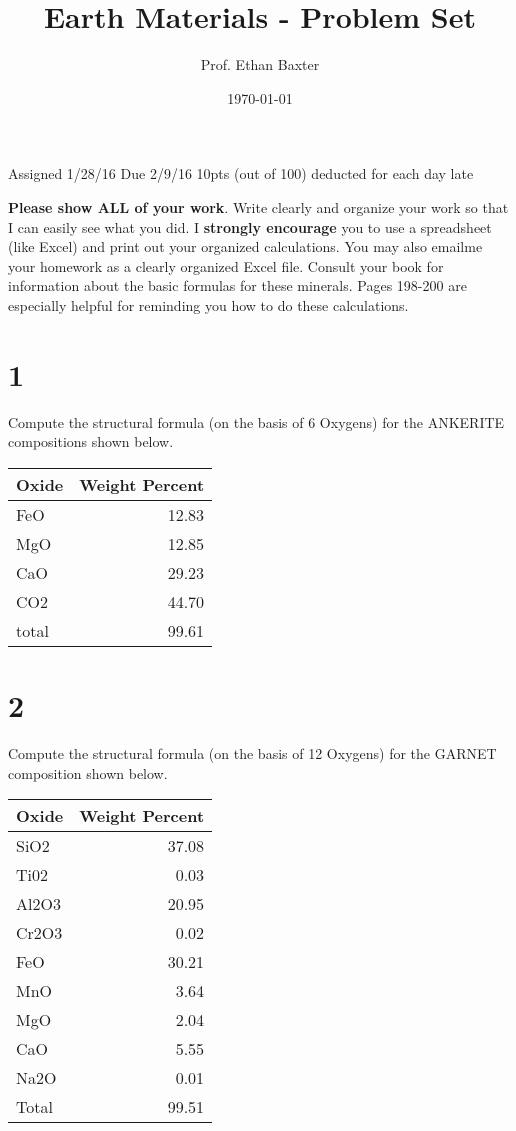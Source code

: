 \documentclass[11pt]{article}
\author{Prof. Ethan Baxter}
\date{\today}
\title{Earth Materials - Problem Set}
\begin{document}
\maketitle
\tableofcontents

Assigned 1/28/16
Due 2/9/16
10pts (out of 100) deducted for each day late

\textbf{Please show ALL of your work}. Write clearly and organize  your work so that I can easily see what  you did. I \textbf{strongly encourage} you to use a spreadsheet (like Excel) and print out your organized calculations. You may also emailme your homework as a clearly organized Excel file. Consult your book for information about the basic formulas for these minerals. Pages 198-200 are especially helpful for reminding you how to do these calculations.

\section{1}
\label{sec-1}
Compute the structural formula (on the basis of 6 Oxygens) for the ANKERITE compositions shown below.

\begin{center}
\begin{tabular}{lr}
\hline
Oxide & Weight Percent\\
\hline
FeO & 12.83\\
MgO & 12.85\\
CaO & 29.23\\
CO2 & 44.70\\
total & 99.61\\
\hline
\end{tabular}
\end{center}

\section{2}
\label{sec-2}
Compute the structural formula (on the basis of 12 Oxygens) for the GARNET composition shown below.

\begin{center}
\begin{tabular}{lr}
\hline
Oxide & Weight Percent\\
\hline
SiO2 & 37.08\\
Ti02 & 0.03\\
Al2O3 & 20.95\\
Cr2O3 & 0.02\\
FeO & 30.21\\
MnO & 3.64\\
MgO & 2.04\\
CaO & 5.55\\
Na2O & 0.01\\
Total & 99.51\\
\hline
\end{tabular}
\end{center}
\end{document}
